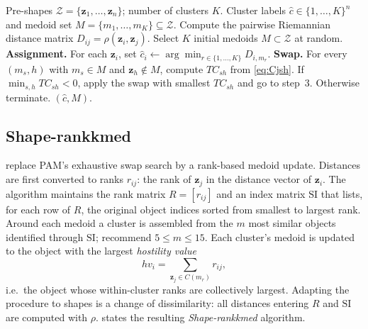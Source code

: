 \documentclass[review,11pt,3p,authoryear]{elsarticle}
\newcommand{\bz}{\mathbf{z}}
\begin{document}
\begin{algorithm}[!htbp]
\caption{Shape-PAM: PAM on Kendall's 2D shape space.}
\label{alg:pam-shape}
\begin{algorithmic}[1]
\Require Pre-shapes $\mathcal{Z}=\{\bz_1,\ldots,\bz_n\}$;
         number of clusters $K$.
\Ensure  Cluster labels $\hat c\in\{1,\ldots,K\}^n$ and medoid set
         $M=\{m_1,\ldots,m_K\}\subseteq\mathcal{Z}$.
\State Compute the pairwise Riemannian distance matrix
       $D_{ij}=\rho(\bz_i,\bz_j)$.
\State Select $K$ initial medoids $M\subset\mathcal{Z}$ at random.
\State \textbf{Assignment.} For each $\bz_i$, set
       $\hat c_i \gets \arg\min_{r\in\{1,\ldots,K\}} D_{i,m_r}$.
\State \textbf{Swap.} For every $(m_s,h)$ with $m_s\in M$ and
       $\bz_h\notin M$, compute $TC_{sh}$ from \eqref{eq:Cjsh}.
\State If $\min_{s,h}TC_{sh}<0$, apply the swap with smallest
       $TC_{sh}$ and go to step~3. Otherwise terminate.
\State \Return $(\hat c, M)$.
\end{algorithmic}
\end{algorithm}

\subsection{Shape-rankkmed}
\label{subsec:rkm-shape}

\citet{zadegan2013ranked} replace PAM's exhaustive swap search by a
rank-based medoid update. Distances are first converted to ranks
$r_{ij}$: the rank of $\bz_j$ in the distance vector of $\bz_i$. The
algorithm maintains the rank matrix $R=[r_{ij}]$ and an index matrix
$\mathrm{SI}$ that lists, for each row of $R$, the original object
indices sorted from smallest to largest rank. Around each medoid a
cluster is assembled from the $m$ most similar objects identified
through $\mathrm{SI}$; \citet{zadegan2013ranked} recommend
$5 \le m \le 15$. Each cluster's medoid is updated to the object with
the largest \emph{hostility value}
\begin{equation}
  hv_i = \sum_{\bz_j\in C(m_r)} r_{ij},
  \label{eq:hostility}
\end{equation}
i.e.\ the object whose within-cluster ranks are collectively largest.
Adapting the procedure to shapes is a change of dissimilarity: all
distances entering $R$ and $\mathrm{SI}$ are computed with $\rho$.
 states the resulting \emph{Shape-rankkmed}
algorithm.
\end{document}
